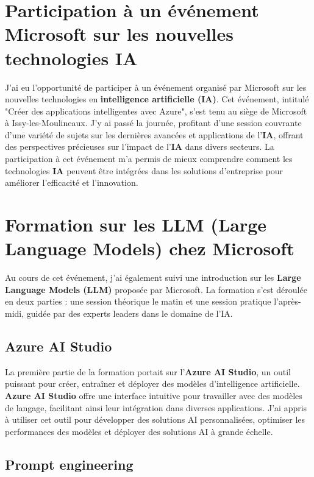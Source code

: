 \section{Participation à un événement Microsoft sur les nouvelles technologies IA}

J'ai eu l'opportunité de participer à un événement organisé par Microsoft sur les nouvelles technologies en \textbf{intelligence artificielle (IA)}. Cet événement, intitulé "Créer des applications intelligentes avec Azure", s'est tenu au siège de Microsoft à Issy-les-Moulineaux. J'y ai passé la journée, profitant d'une session couvrante d'une variété de sujets sur les dernières avancées et applications de l'\textbf{IA}, offrant des perspectives précieuses sur l'impact de l'\textbf{IA} dans divers secteurs. La participation à cet événement m'a permis de mieux comprendre comment les technologies \textbf{IA} peuvent être intégrées dans les solutions d'entreprise pour améliorer l'efficacité et l'innovation.

\section{Formation sur les LLM (Large Language Models) chez Microsoft}

Au cours de cet événement, j'ai également suivi une introduction sur les \textbf{Large Language Models (LLM)} proposée par Microsoft. La formation s'est déroulée en deux parties : une session théorique le matin et une session pratique l'après-midi, guidée par des experts leaders dans le domaine de l'IA.

\subsection{Azure AI Studio}

La première partie de la formation portait sur l'\textbf{Azure AI Studio}, un outil puissant pour créer, entraîner et déployer des modèles d'intelligence artificielle. \textbf{Azure AI Studio} offre une interface intuitive pour travailler avec des modèles de langage, facilitant ainsi leur intégration dans diverses applications. J'ai appris à utiliser cet outil pour développer des solutions AI personnalisées, optimiser les performances des modèles et déployer des solutions AI à grande échelle.

\subsection{Prompt engineering}

